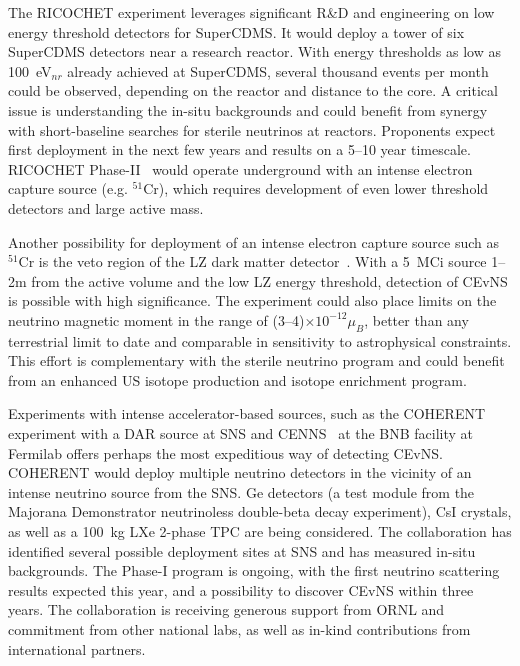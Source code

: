 The RICOCHET experiment leverages significant R\&D and engineering on
low energy threshold detectors for SuperCDMS. It would deploy a tower
of six SuperCDMS detectors near a research reactor. With energy
thresholds as low as 100~eV$_{nr}$ already achieved at SuperCDMS,
several thousand events per month could be observed, depending on the
reactor and distance to the core. A critical issue is understanding
the in-situ backgrounds and could benefit from synergy with
short-baseline searches for sterile neutrinos at reactors.  Proponents
expect first deployment in the next few years and results on a 5--10
year timescale.  RICOCHET Phase-II~\cite{Formaggio:2011jt} would
operate underground with an intense electron capture source
(e.g. $^{51}$Cr), which requires development of even lower threshold
detectors and large active mass.

Another possibility for deployment of an intense electron capture
source such as $^{51}$Cr is the veto region of the LZ dark matter
detector~\cite{Coloma:2014hka}. With a 5~MCi source 1--2m from the
active volume and the low LZ energy threshold, detection
of CEvNS is possible with high significance. The experiment could
also place limits on the neutrino magnetic moment in the range
of (3--4)$\times10^{-12}\mu_B$, better than any terrestrial limit to
date and comparable in sensitivity to astrophysical constraints. This
effort is complementary with the sterile neutrino program and
could benefit from an enhanced US isotope production and
isotope enrichment program.


Experiments with intense accelerator-based sources, such as the
COHERENT~\cite{Akimov:2013yow} experiment with a DAR source at SNS and
CENNS~\cite{Brice:2013fwa} at the BNB facility at Fermilab offers
perhaps the most expeditious way of detecting CEvNS. COHERENT
would deploy multiple neutrino detectors in the vicinity of an intense
neutrino source from the SNS. Ge detectors (a test module from
the {\sc Majorana Demonstrator\/} neutrinoless double-beta decay
experiment), CsI crystals, as well as a 100~kg LXe 2-phase TPC are
being considered. The collaboration has identified several possible
deployment sites at SNS and has measured in-situ backgrounds.  The
Phase-I program is  ongoing, with the first neutrino scattering
results expected this year, and a possibility to discover CEvNS
within three years. The collaboration is receiving generous support
from ORNL and commitment from other national labs, as well as in-kind
contributions from international partners. 


